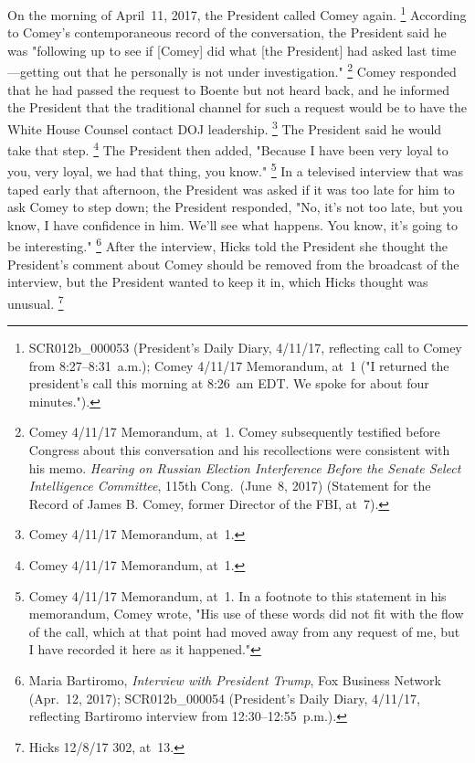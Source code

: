 On the morning of April~11, 2017, the President called Comey again.%
\footnote{SCR012b\_000053 (President's Daily Diary, 4/11/17, reflecting call to Comey from 8:27--8:31~a.m.);
Comey 4/11/17 Memorandum, at~1 ("I returned the president's call this morning at 8:26~am EDT\null.
We spoke for about four minutes.").}
According to Comey's contemporaneous record of the conversation, the President said he was "following up to see if [Comey] did what [the President] had asked last time---getting out that he personally is not under investigation."%
\footnote{Comey 4/11/17 Memorandum, at~1.
Comey subsequently testified before Congress about this conversation and his recollections were consistent with his memo.
\textit{Hearing on Russian Election Interference Before the Senate Select Intelligence Committee}, 115th Cong.\ (June~8, 2017) (Statement for the Record of James B. Comey, former Director of the FBI, at~7).}
Comey responded that he had passed the request to Boente but not heard back, and he informed the President that the traditional channel for such a request would be to have the White House Counsel contact DOJ leadership.%
\footnote{Comey 4/11/17 Memorandum, at~1.}
The President said he would take that step.%
\footnote{Comey 4/11/17 Memorandum, at~1.}
The President then added, "Because I have been very loyal to you, very loyal, we had that thing, you know."%
\footnote{Comey 4/11/17 Memorandum, at~1.
In a footnote to this statement in his memorandum, Comey wrote, "His use of these words did not fit with the flow of the call, which at that point had moved away from any request of me, but I have recorded it here as it happened."}
In a televised interview that was taped early that afternoon, the President was asked if it was too late for him to ask Comey to step down;
the President responded, "No, it's not too late, but you know, I have confidence in him.
We'll see what happens.
You know, it's going to be interesting."%
\footnote{Maria Bartiromo, \textit{Interview with President Trump}, Fox Business Network (Apr.~12, 2017); SCR012b\_000054 (President's Daily Diary, 4/11/17, reflecting Bartiromo interview from 12:30--12:55~p.m.).}
After the interview, Hicks told the President she thought the President's comment about Comey should be removed from the broadcast of the interview, but the President wanted to keep it in, which Hicks thought was unusual.%
\footnote{Hicks 12/8/17 302, at~13.}

